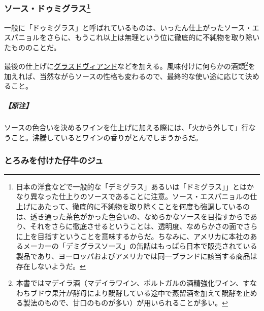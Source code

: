 \begin{recette}
\hypertarget{sauce-demi-glace}{%
\subsubsection[ソース・ドゥミグラス]{\texorpdfstring{ソース・ドゥミグラス\footnote{日本の洋食などで一般的な「デミグラス」あるいは「ドミグラス」」とはかなり異なった仕上りのソースであることに注意。ソース・エスパニョルの仕上げにあたって、徹底的に不純物を取り除くことを何度も強調しているのは、透き通った茶色がかった色合いの、なめらかなソースを目指すからであり、それをさらに徹底させるということは、透明度、なめらかさの面でさらに上を目指すということを意味するからだ。ちなみに、アメリカに本社のあるメーカーの「デミグラスソース」の缶詰はもっぱら日本で販売されている製品であり、ヨーロッパおよびアメリカでは同一ブランドに該当する商品は存在しないようだ。}}{ソース・ドゥミグラス}}\label{sauce-demi-glace}}



一般に「ドゥミグラス」と呼ばれているものは、いったん仕上がったソース・エスパニョルをさらに、もうこれ以上は無理という位に徹底的に不純物を取り除いたもののことだ。

最後の仕上げに\protect\hyperlink{glace-de-viande}{グラスドヴィアンド}などを加える。風味付けに何らかの酒類\footnote{本書ではマデイラ酒（マデイラワイン、ポルトガルの酒精強化ワイン、すなわちブドウ果汁が酵母により醗酵している途中で蒸留酒を加えて醗酵を止める製法のもので、甘口のものが多い）が用いられることが多い。}を加えれば、当然ながらソースの性格も変わるので、最終的な使い途に応じて決めること。

\hypertarget{nota-sauce-demi-glace}{%
\subparagraph{【原注】}\label{nota-sauce-demi-glace}}

ソースの色合いを決めるワインを仕上げに加える際には、「火から外して」行なうこと。沸騰しているとワインの香りがとんでしまうからだ。

\hypertarget{jus-de-veau-lie}{%
\subsubsection{とろみを付けた仔牛のジュ}\label{jus-de-veau-lie}}



\end{recette}

